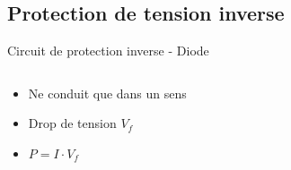 \subsection{Protection de tension inverse}
\begin{frame}{Circuit de protection inverse - Diode}
    \begin{columns}
        \begin{column}{0.33\textwidth}
            \begin{itemize}
                \item Ne conduit que dans un sens
                \bigskip
                \item Drop de tension $V_f$
                \item $P = I \cdot V_f$
            \end{itemize}
        \end{column}
        \begin{column}{0.66\textwidth}
            \begin{center}
            \vspace{-24pt}
            \end{center}
        \end{column}
    \end{columns}
\end{frame}

